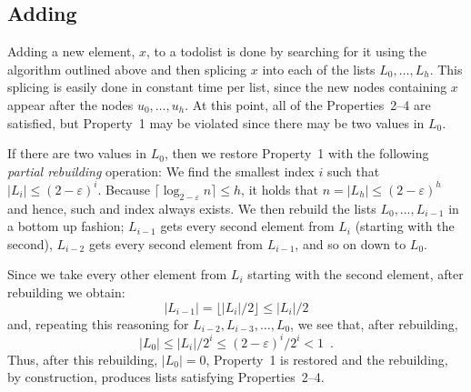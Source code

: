 \documentclass{patmorin}
\newcommand{\eps}{\varepsilon}
\begin{document}
\vspace{1ex}
\begin{algorithmic}
    \ENDIF
  \ENDFOR
\end{algorithmic}

\subsection{Adding}

Adding a new element, $x$, to a todolist is done by searching for it
using the algorithm outlined above and then splicing $x$ into each of
the lists $L_0,\ldots,L_h$.  This splicing is easily done in constant
time per list, since the new nodes containing $x$ appear after the nodes
$u_0,\ldots,u_h$.  At this point, all of the Properties~2--4 are satisfied,
but Property~1 may be violated since there may be two values in $L_0$.

If there are two values in $L_0$, then we restore Property~1 with the
following \emph{partial rebuilding} operation: We find the smallest index
$i$ such that $|L_i|\le (2-\eps)^i$. Because
$\lceil \log_{2-\varepsilon} n\rceil\leq h$, it holds that $n=|L_h|\le(2-\eps)^h$ and hence, such and index always exists.  
We then rebuild the lists $L_{0},\ldots,L_{i-1}$
in a bottom up fashion; $L_{i-1}$ gets every second element from $L_i$
(starting with the second), $L_{i-2}$ gets every second element from
$L_{i-1}$, and so on down to $L_0$.

Since we take every other element from $L_i$ starting with the second element,
after rebuilding we obtain:
\[
   |L_{i-1}| = \lfloor |L_i|/2 \rfloor \le |L_i|/2
\]
and, repeating this reasoning for $L_{i-2}, L_{i-3},\ldots, L_0$, we see that, after rebuilding,
\[
   |L_{0}| \le |L_i|/2^i \le (2-\eps)^i/2^i < 1 \enspace .
\]
Thus, after this rebuilding, $|L_0|=0$, Property~1 is restored and the
rebuilding, by construction, produces lists satisfying Properties~2--4.
\end{document}

